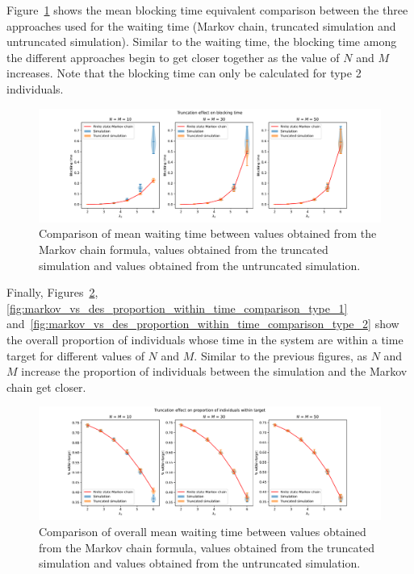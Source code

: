 Figure~\ref{fig:markov_vs_des_blocking_time_comparison_overall} shows
the mean blocking time equivalent comparison between the three approaches used
for the waiting time (Markov chain, truncated simulation and untruncated
simulation).
Similar to the waiting time, the blocking time among the different approaches
begin to get closer together as the value of \(N\) and \(M\) increases.
Note that the blocking time can only be calculated for type 2 individuals.

\begin{figure}[H]
    \includegraphics[width=\textwidth]{chapters/03_queueing_model/img/numeric_results_and_timings/truncation_effect/blocking_time_type_2.pdf}
    \caption{
        Comparison of mean waiting time between values obtained from the Markov
        chain formula, values obtained from the truncated simulation and values
        obtained from the untruncated simulation.
    }
    \label{fig:markov_vs_des_blocking_time_comparison_overall}
\end{figure}

Finally, Figures~\ref{fig:markov_vs_des_proportion_within_time_comparison_overall},
\ref{fig:markov_vs_des_proportion_within_time_comparison_type_1}
and~\ref{fig:markov_vs_des_proportion_within_time_comparison_type_2} show the
overall proportion of individuals whose time in the system are within
a time target for different values of \(N\) and \(M\).
Similar to the previous figures, as \(N\) and \(M\) increase the proportion of
individuals between the simulation and the Markov chain get closer.


\begin{figure}[H]
    \includegraphics[width=\textwidth]{chapters/03_queueing_model/img/numeric_results_and_timings/truncation_effect/proportion_overall.pdf}
    \caption{
        Comparison of overall mean waiting time between values obtained from the
        Markov chain formula, values obtained from the truncated simulation and
        values obtained from the untruncated simulation.
    }
    \label{fig:markov_vs_des_proportion_within_time_comparison_overall}
\end{figure}

